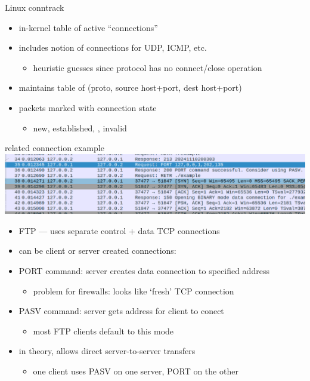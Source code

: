 \begin{frame}{Linux conntrack}
    \begin{itemize}
    \item in-kernel table of active ``connections''
    \item includes notion of connections for UDP, ICMP, etc.
        \begin{itemize}
        \item heuristic guesses since protocol has no connect/close operation
        \end{itemize}
    \item maintains table of (proto, source host+port, dest host+port)
    \item packets marked with connection state
        \begin{itemize}
        \item new, established, , invalid
        \end{itemize}
    \end{itemize}
\end{frame}

\begin{frame}{related connection example}
\includegraphics[width=\textwidth]{../fire/ftp-port-ex.png}
\begin{itemize}
\item FTP --- uses separate control + data TCP connections
\item can be client or server created connections:
\vspace{.5cm}
\item PORT command: server creates data connection to specified address
    \begin{itemize}
    \item problem for firewalls: looks like `fresh' TCP connection
    \end{itemize}
\item PASV command: server gets address for client to conect
    \begin{itemize}
    \item most FTP clients default to this mode
    \end{itemize}
\item in theory, allows direct server-to-server transfers
    \begin{itemize}
    \item one client uses PASV on one server, PORT on the other
    \end{itemize}
\end{itemize}
\end{frame}

